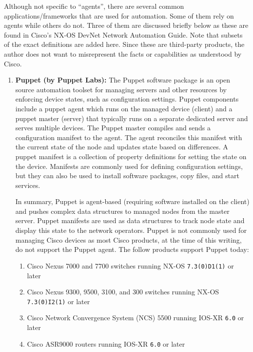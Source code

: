 Although not specific to ``agents'', there are several common
applications/frameworks that are used for automation. Some of them rely on
agents while others do not. Three of them are discussed briefly below as these
are found in Cisco’s NX-OS DevNet Network Automation Guide. Note that subsets
of the exact definitions are added here. Since these are third-party products,
the author does not want to misrepresent the facts or capabilities as
understood by Cisco.

\begin{enumerate}
  \item \textbf{Puppet (by Puppet Labs):} The Puppet software package is an
  open source automation toolset for managing servers and other resources by
  enforcing device states, such as configuration settings. Puppet components
  include a puppet agent which runs on the managed device (client) and a
  puppet master (server) that typically runs on a separate dedicated server
  and serves multiple devices. The Puppet master compiles and sends a
  configuration manifest to the agent. The agent reconciles this manifest with
  the current state of the node and updates state based on differences. A
  puppet manifest is a collection of property definitions for setting the
  state on the device. Manifests are commonly used for defining configuration
  settings, but they can also be used to install software packages, copy
  files, and start services.
  
  In summary, Puppet is agent-based (requiring software installed on the
  client) and pushes complex data structures to managed nodes from the master
  server. Puppet manifests are used as data structures to track node state and
  display this state to the network operators. Puppet is not commonly used for
  managing Cisco devices as most Cisco products, at the time of this writing,
  do not support the Puppet agent. The follow products support Puppet today:

  \begin{enumerate}
    \item Cisco Nexus 7000 and 7700 switches running NX-OS \verb|7.3(0)D1(1)| or later
    \item Cisco Nexus 9300, 9500, 3100, and 300 switches running NX-OS
 	\verb|7.3(0)I2(1)| or later
    \item Cisco Network Convergence System (NCS) 5500 running IOS-XR \verb|6.0| or later
    \item Cisco ASR9000 routers running IOS-XR \verb|6.0| or later
  \end{enumerate}


\end{enumerate}

